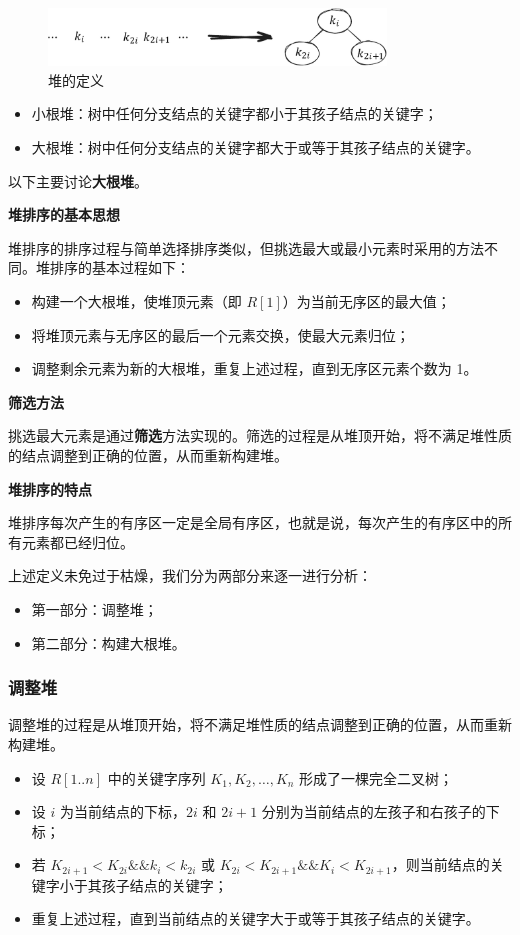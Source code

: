 \documentclass[lang=cn,newtx,10pt,scheme=chinese]{../elegantbook}
\begin{document}
\begin{figure}[h!]
    \centering
    \includegraphics[width=0.8\textwidth]{./figure/pdf/cropped/heap.pdf}
    \caption{堆的定义}
    \label{fig:heap}
\end{figure}
\begin{itemize}
  \item 小根堆：树中任何分支结点的关键字都小于其孩子结点的关键字；
  \item 大根堆：树中任何分支结点的关键字都大于或等于其孩子结点的关键字。
\end{itemize}

以下主要讨论\textbf{大根堆}。


\textbf{堆排序的基本思想}  

堆排序的排序过程与简单选择排序类似，但挑选最大或最小元素时采用的方法不同。堆排序的基本过程如下：
\begin{itemize}
  \item 构建一个大根堆，使堆顶元素（即 $R[1]$）为当前无序区的最大值；
  \item 将堆顶元素与无序区的最后一个元素交换，使最大元素归位；
  \item 调整剩余元素为新的大根堆，重复上述过程，直到无序区元素个数为 1。
\end{itemize}


\textbf{筛选方法}  

挑选最大元素是通过\textbf{筛选}方法实现的。筛选的过程是从堆顶开始，将不满足堆性质的结点调整到正确的位置，从而重新构建堆。


\textbf{堆排序的特点} 

堆排序每次产生的有序区一定是全局有序区，也就是说，每次产生的有序区中的所有元素都已经归位。

上述定义未免过于枯燥，我们分为两部分来逐一进行分析：
\begin{itemize}
  \item 第一部分：调整堆；
  \item 第二部分：构建大根堆。
  \end{itemize}
\subsubsection{调整堆}

调整堆的过程是从堆顶开始，将不满足堆性质的结点调整到正确的位置，从而重新构建堆。
\begin{itemize}
  \item 设 $R[1..n]$ 中的关键字序列 $K_1, K_2, \dots, K_n$ 形成了一棵完全二叉树；
  \item 设 $i$ 为当前结点的下标，$2i$ 和 $2i+1$ 分别为当前结点的左孩子和右孩子的下标；
  \item 若 $K_{2i+1} < K_{2i} \&\& k_i < k_{2i}$ 或 $K_{2i} < K_{2i+1} \&\& K_i < K_{2i+1}$，则当前结点的关键字小于其孩子结点的关键字；
  \item 重复上述过程，直到当前结点的关键字大于或等于其孩子结点的关键字。
\end{itemize}
\end{document}
